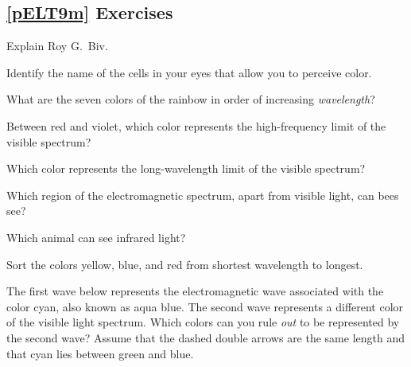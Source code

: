 \documentclass{article}
\numberwithin{equation}{section}
\numberwithin{figure}{section}
\begin{document}
\subsection*{\ref{pELT9m} Exercises}

\begin{exercise}
    Explain Roy G.~Biv.
\end{exercise}

\begin{exercise}
    Identify the name of the cells in your eyes that allow you to perceive color.
\end{exercise}

\begin{exercise}
    What are the seven colors of the rainbow in order of increasing \textit{wavelength}?
\end{exercise}

\begin{exercise}
    Between red and violet, which color represents the high-frequency limit of the visible spectrum?
\end{exercise}

\begin{exercise}
    Which color represents the long-wavelength limit of the visible spectrum?
\end{exercise}

\begin{exercise}
    Which region of the electromagnetic spectrum, apart from visible light, can bees see?
\end{exercise}

\begin{exercise}
    Which animal can see infrared light?
\end{exercise}

\begin{exercise} \label{lwLSKO}
    Sort the colors yellow, blue, and red from shortest wavelength to longest.
\end{exercise}

\begin{exercise}
    The first wave below represents the electromagnetic wave associated with the color cyan, also known as aqua blue. The second wave represents a different color of the visible light spectrum. Which colors can you rule \textit{out} to be represented by the second wave? Assume that the dashed double arrows are the same length and that cyan lies between green and blue.
\end{exercise}
\end{document}
